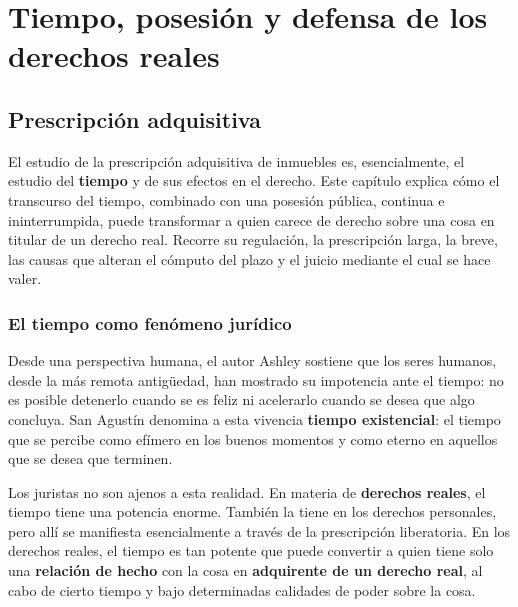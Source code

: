 \documentclass[12pt,oneside]{book}
\begin{document}


\part{Tiempo, posesión y defensa de los derechos reales}

\chapter{Prescripción adquisitiva}\label{cap:prescripcion}

El estudio de la prescripción adquisitiva de inmuebles es, esencialmente, el estudio del \textbf{tiempo} y de sus efectos en el derecho. Este capítulo explica cómo el transcurso del tiempo, combinado con una posesión pública, continua e ininterrumpida, puede transformar a quien carece de derecho sobre una cosa en titular de un derecho real. Recorre su regulación, la prescripción larga, la breve, las causas que alteran el cómputo del plazo y el juicio mediante el cual se hace valer.

\section{El tiempo como fenómeno jurídico}

Desde una perspectiva humana, el autor Ashley sostiene que los seres humanos, desde la más remota antigüedad, han mostrado su impotencia ante el tiempo: no es posible detenerlo cuando se es feliz ni acelerarlo cuando se desea que algo concluya. San Agustín denomina a esta vivencia \textbf{tiempo existencial}: el tiempo que se percibe como efímero en los buenos momentos y como eterno en aquellos que se desea que terminen.

Los juristas no son ajenos a esta realidad. En materia de \textbf{derechos reales}, el tiempo tiene una potencia enorme. También la tiene en los derechos personales, pero allí se manifiesta esencialmente a través de la prescripción liberatoria. En los derechos reales, el tiempo es tan potente que puede convertir a quien tiene solo una \textbf{relación de hecho} con la cosa en \textbf{adquirente de un derecho real}, al cabo de cierto tiempo y bajo determinadas calidades de poder sobre la cosa.
\end{document}
